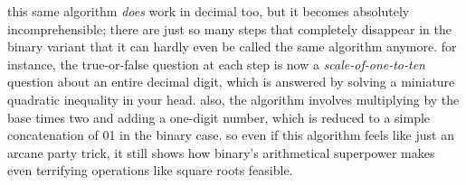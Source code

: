 \documentclass[../best.tex]{subfiles}
\begin{document}
this same algorithm \emph{does} work in decimal too, but it becomes absolutely incomprehensible; there are just so many steps that completely disappear in the binary variant that it can hardly even be called the same algorithm anymore. for instance, the true-or-false question at each step is now a \emph{scale-of-one-to-ten} question about an entire decimal digit, which is answered by solving a miniature quadratic inequality in your head. also, the algorithm involves multiplying by the base times two and adding a one-digit number, which is reduced to a simple concatenation of 01 in the binary case.\myfootnote{} so even if this algorithm feels like just an arcane party trick, it still shows how binary's arithmetical superpower makes even terrifying operations like square roots feasible.
\end{document}
